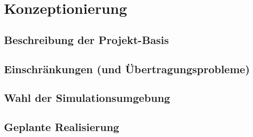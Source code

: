 \chapter{Konzeptionierung}
\section{Beschreibung der Projekt-Basis}

\section{Einschränkungen (und Übertragungsprobleme)}

\section{Wahl der Simulationsumgebung}

\section{Geplante Realisierung}